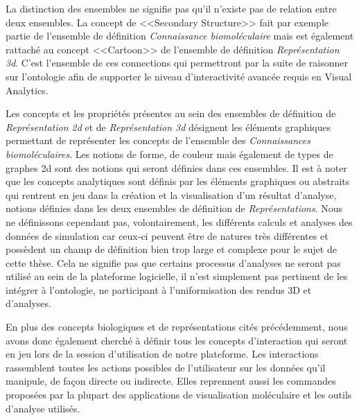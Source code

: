 La distinction des ensembles ne signifie pas qu'il n'existe pas de relation entre deux ensembles. La concept de <<Secondary Structure>> fait par exemple partie de l'ensemble de définition \textit{Connaissance biomoléculaire} mais est également rattaché au concept <<Cartoon>> de l'ensemble de définition \textit{Représentation 3d}. C'est l'ensemble de ces connections qui permettront par la suite de raisonner sur l'ontologie afin de supporter le niveau d'interactivité avancée requis en Visual Analytics.

Les concepts et les propriétés présentes au sein des ensembles de définition de \textit{Représentation 2d} et de \textit{Représentation 3d} désignent les éléments graphiques permettant de représenter les concepts de l'ensemble des \textit{Connaissances biomoléculaires}. Les notions de forme, de couleur mais également de types de graphes 2d sont des notions qui seront définies dans ces ensembles.  Il est à noter que les concepts analytiques sont définis par les éléments graphiques ou abstraits qui rentrent en jeu dans la création et la visualisation d'un résultat d'analyse, notions définies dans les deux ensembles de définition de \textit{Représentations}. Nous ne définissons cependant pas, volontairement, les différents calculs et analyses des données de simulation car ceux-ci peuvent être de natures très différentes et possèdent un champ de définition bien trop large et complexe pour le sujet de cette thèse. Cela ne signifie pas que certains processus d'analyses ne seront pas utilisé au sein de la plateforme logicielle, il n'est simplement pas pertinent de les intégrer à l'ontologie, ne participant à l'uniformisation des rendus 3D et d'analyses.

En plus des concepts biologiques et de représentations cités précédemment, nous avons donc également cherché à définir tous les concepts d'interaction qui seront en jeu lors de la session d'utilisation de notre plateforme. Les interactions rassemblent toutes les actions possibles de l'utilisateur sur les données qu'il manipule, de façon directe ou indirecte. Elles reprennent aussi les commandes proposées par la plupart des applications de visualisation moléculaire et les outils d'analyse utilisés.


